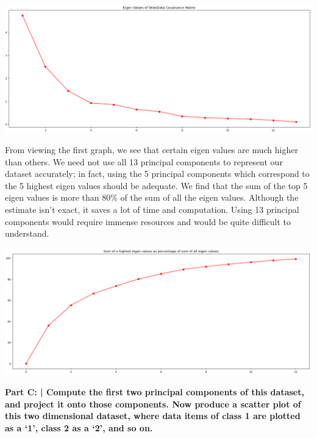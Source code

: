 \documentclass{article}
\begin{document}
 \includegraphics[scale=0.4]{HW9_2.PNG}\newline
 
 From viewing the first graph, we see that certain eigen values are much higher than others. We need not use all 13 principal components to represent our dataset accurately; in fact, using the 5 principal components which correspond to the 5 highest eigen values should be adequate. We find that the sum of the top 5 eigen values is more than 80\% of the sum of all the eigen values. Although the estimate isn't exact, it saves a lot of time and computation. Using 13 principal components would require immense resources and would be quite difficult to understand.
 
 \includegraphics[scale=0.4]{HW9_3.PNG}\newline
 
 \newline
 
 \textbf{Part C: | Compute the first two principal components of this dataset, and project it onto those components. Now produce a scatter plot of this two dimensional dataset, where data items of class 1 are plotted as a ‘1’, class 2 as a ‘2’, and so on.}\newline
 
\end{document}
